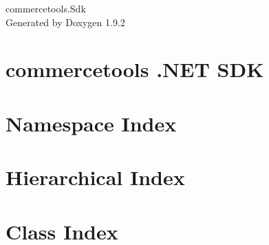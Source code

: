 \documentclass[twoside]{book}
\newcommand{\+}{\discretionary{\mbox{\scriptsize$\hookleftarrow$}}{}{}}
\newcommand{\clearemptydoublepage}{%
    \newpage{\pagestyle{empty}\cleardoublepage}%
  }
\begin{document}
  \raggedbottom
    \hypersetup{pageanchor=false,
                bookmarksnumbered=true,
                pdfencoding=unicode
               }
  \begin{titlepage}
  \vspace*{7cm}
  \begin{center}%
  {\Large commercetools.\+Sdk}\\
  \vspace*{1cm}
  {\large Generated by Doxygen 1.9.2}\\
  \end{center}
  \end{titlepage}
  \clearemptydoublepage
  \tableofcontents
  \clearemptydoublepage
  \hypersetup{pageanchor=true}
\chapter{commercetools .NET SDK}
\label{index}\hypertarget{index}{}
\chapter{Namespace Index}

\chapter{Hierarchical Index}

\chapter{Class Index}

\end{document}
